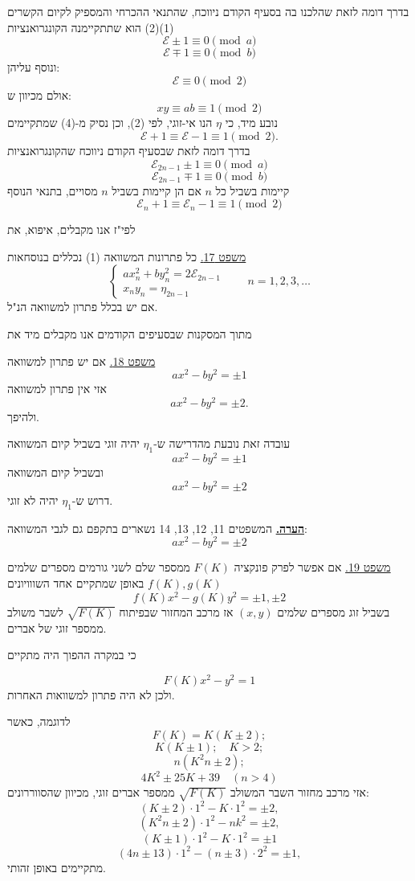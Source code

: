 \noindent בדרך דומה לזאת שהלכנו בה בסעיף הקודם ניווכח, שהתנאי ההכרחי והמספיק לקיום הקשרים (1)(2) הוא שתתקיימנה הקונגרואנציות
\[ \mathcal{E} \pm 1 \equiv 0 \pmod{a} \tag{4} \]
\[ \mathcal{E} \mp 1 \equiv 0 \pmod{b} \]
ונוסף עליהן:
\[ \mathcal{E} \equiv 0 \pmod{2} \]
אולם מכיוון ש:
\[ xy \equiv ab \equiv 1 \pmod{2} \]
נובע מיד, כי $\eta$ הנו אי-זוגי, לפי (2), וכן נסיק מ-(4) שמתקיימים
\[ \mathcal{E} + 1 \equiv \mathcal{E} - 1 \equiv 1 \pmod{2} . \]
בדרך דומה לזאת שבסעיף הקודם ניווכח שהקונגרואנציות
\[ \mathcal{E}_{2n-1} \pm 1 \equiv 0 \pmod{a} \]
\[ \mathcal{E}_{2n-1} \mp 1 \equiv 0 \pmod{b} \]
קיימות בשביל כל $n$ אם הן קיימות בשביל $n$ מסויים, בתנאי הנוסף
\[ \mathcal{E}_n + 1 \equiv \mathcal{E}_n - 1 \equiv 1 \pmod{2} \]

\noindent לפי"ז אנו מקבלים, איפוא, את

\medskip
\noindent\underline{משפט 17.} כל פתרונות המשוואה (1) נכללים בנוסחאות
\[ \begin{cases} ax_n^2 + by_n^2 = 2\mathcal{E}_{2n-1} \\ x_ny_n = \eta_{2n-1} \end{cases} \qquad n = 1 , 2 , 3 , \ldots \tag{5} \]
אם יש בכלל פתרון למשוואה הנ"ל.

\noindent מתוך המסקנות שבסעיפים הקודמים אנו מקבלים מיד את

\medskip
\noindent\underline{משפט 18.} אם יש פתרון למשוואה
\[ ax^2 - by^2 = \pm 1 \]
אזי אין פתרון למשוואה
\[ ax^2 - by^2 = \pm 2 . \]
ולהיפך.

\noindent עובדה זאת נובעת מהדרישה ש-$\eta_1$ יהיה זוגי בשביל קיום המשוואה
\[ ax^2 - by^2 = \pm 1 \]
ובשביל קיום המשוואה
\[ ax^2 - by^2 = \pm 2 \]
דרוש ש-$\eta_1$ יהיה לא זוגי.

\medskip
\noindent\textbf{\underline{הערה.}} המשפטים 11, 12, 13, 14 נשארים בתקפם גם לגבי המשוואה:
\[ ax^2 - by^2 = \pm 2 \]

\medskip
\noindent\underline{משפט 19.} אם אפשר לפרק פונקציה $F(K)$ ממספר שלם לשני גורמים מספרים שלמים $f(K), g(K)$ באופן שמתקיים אחד השווויונים
\[ f(K)x^2 - g(K)y^2 = \pm 1 , \pm 2 \]
בשביל זוג מספרים שלמים $(x,y)$ אז מרכב המחזור שבפיתוח $\sqrt{F(K)}$ לשבר משולב ממספר זוגי של אברים.

\noindent כי במקרה ההפוך היה מתקיים

\[ F(K)x^2 - y^2 = 1 \]
ולכן לא היה פתרון למשוואות האחרות.

\noindent לדוגמה, כאשר
\[ F(K) = K(K\pm2); \]
\[ K(K\pm1); \quad K>2; \]
\[ n(K^2n\pm2); \]
\[ 4K^2 \pm 25K + 39 \quad (n>4) \]
אזי מרכב מחזור השבר המשולב $\sqrt{F(K)}$ ממספר אברים זוגי, מכיוון שהסווררונים:
\[ (K\pm2) \cdot 1^2 - K \cdot 1^2 = \pm 2 , \]
\[ (K^2n\pm2) \cdot 1^2 - nk^2 = \pm 2 , \]
\[ (K\pm1) \cdot 1^2 - K \cdot 1^2 = \pm 1 \]
\[ (4n\pm13) \cdot 1^2 - (n\pm3) \cdot 2^2 = \pm 1 , \]
מתקיימים באופן זהותי.


